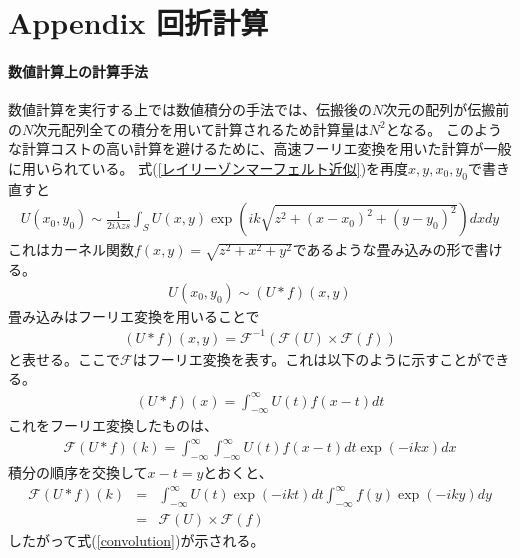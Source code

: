\documentclass[a4paper,11pt,uplatex]{jsbook}
\begin{document}
\chapter*{Appendix 回折計算}\label{chap:FFT}
\renewcommand{\theequation}{A.\arabic{equation}}
\setcounter{equation}{0}
\subsubsection{数値計算上の計算手法}

数値計算を実行する上では数値積分の手法では、伝搬後の$N$次元の配列が伝搬前の$N$次元配列全ての積分を用いて計算されるため計算量は$N^2$となる。
このような計算コストの高い計算を避けるために、高速フーリエ変換を用いた計算が一般に用いられている。
式(\ref{レイリーゾンマーフェルト近似})を再度$x,y,x_0,y_0$で書き直すと
\begin{eqnarray}
  U(x_0,y_0) \sim \frac{1}{2i\lambda zs}\int_S U(x,y) \exp( ik \sqrt{z^2 + (x-x_0)^2 + (y-y_0)^2}) dxdy
\end{eqnarray}
これはカーネル関数$f(x,y) = \sqrt{z^2 +x^2 + y^2}$であるような畳み込みの形で書ける。
\begin{eqnarray}
  U(x_0,y_0) \sim (U * f)(x,y)
\end{eqnarray}
畳み込みはフーリエ変換を用いることで
\begin{eqnarray}
  (U*f)(x,y) = \mathcal{F}^{-1}(\mathcal{F}(U) \times \mathcal{F}(f)) \label{convolution}
\end{eqnarray}
と表せる。ここで$\mathcal{F}$はフーリエ変換を表す。これは以下のように示すことができる。
\begin{eqnarray}
  (U*f)(x) = \int_{-\infty}^{\infty} U(t)f(x-t)dt
\end{eqnarray}
これをフーリエ変換したものは、
\begin{eqnarray}
  \mathcal{F}(U*f)(k) = \int_{-\infty}^{\infty} \int_{-\infty}^{\infty} U(t)f(x-t)dt \exp(-ikx)dx
\end{eqnarray}
積分の順序を交換して$x-t = y$とおくと、
\begin{eqnarray}
  \mathcal{F}(U*f)(k) &=& \int_{-\infty}^{\infty} U(t) \exp(-ikt)dt \int_{-\infty}^{\infty} f(y) \exp(-iky)dy\\
  &=& \mathcal{F}(U) \times \mathcal{F}(f)
\end{eqnarray}
したがって式(\ref{convolution})が示される。
\end{document}
